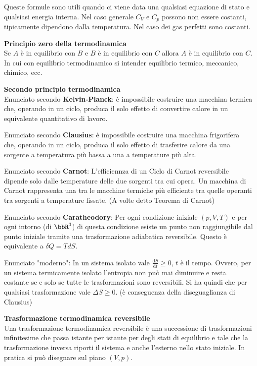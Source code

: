 \documentclass[10pt,a4paper]{article}
\newcommand{\de}{{\ensuremath{ \mbox{d}}}}
\begin{document}
\begin{multicols}{2}
Queste formule sono utili quando ci viene data una qualsiasi equazione di stato e qualsiasi energia interna. Nel caso generale $C_V$ e $C_p$ possono non essere costanti, tipicamente dipendono dalla temperatura. Nel caso dei gas perfetti sono costanti.

\textbf{Principio zero della termodinamica} \\
Se $A$ è in equilibrio con $B$ e $B$ è in equilibrio con $C$ allora $A$ è in equilibrio con $C$.
In cui con equilibrio termodinamico si intender equilibrio termico, meccanico, chimico, ecc.

\textbf{Secondo principio termodinamica} \\
Enunciato secondo \textbf{Kelvin-Planck}: è impossibile costruire una macchina termica che, operando in un ciclo, produca il solo effetto di convertire calore in un equivalente quantitativo di lavoro.

Enunciato secondo \textbf{Clausius}: è impossibile costruire una macchina frigorifera che, operando in un ciclo, produca il solo effetto di trasferire calore da una sorgente a temperatura più bassa a una a temperature più alta.

Enunciato secondo \textbf{Carnot}: L'efficiennza di un Ciclo di Carnot reversibile dipende solo dalle temperature delle due sorgenti tra cui opera. Un macchina di Carnot rappresenta una tra le macchine termiche più efficiente tra quelle operanti tra sorgenti a temperature fissate. (A volte detto Teorema di Carnot)

Enunciato secondo \textbf{Caratheodory}: Per ogni condizione iniziale $(p,V,T)$ e per ogni intorno (di $\bbR^3$) di questa condizione esiste un punto non raggiungibile dal punto iniziale tramite una trasformazione adiabatica reversibile. Questo è equivalente a $\delta Q= T dS$.

Enunciato "moderno": In un sistema isolato vale $\frac{\de S}{\de t} \ge 0$, $t$ è il tempo. Ovvero, per un sistema termicamente isolato l'entropia non può mai diminuire e resta costante se e solo se tutte le trasformazioni sono reversibili. Si ha quindi che per qualsiasi trasformazione vale $\Delta S\ge0$. (è conseguenza della diseguaglianza di Clausius)

\textbf{Trasformazione termodinamica reversibile} \\
Una trasformazione termodinamica reversibile è una successione di trasformazioni infinitesime che passa istante per istante per degli stati di equilibrio e tale che la trasformazione inversa riporti il sistema e anche l'esterno nello stato iniziale.
In pratica si può disegnare sul piano $(V,p)$.


\end{multicols}
\end{document}
